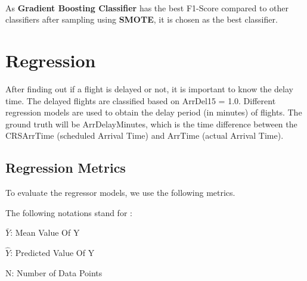 \documentclass[12pt,letter-paper]{article}
\begin{document}
    \paragraph{}
    As {\bfseries Gradient Boosting Classifier} has the best F1-Score compared to other classifiers after sampling using {\bfseries SMOTE}, it is chosen as the best classifier.
    
\section{Regression}

    After finding out if a flight is delayed or not, it is important to know the delay time. The delayed flights are classified based on ArrDel15 = 1.0. Different regression models are used to obtain the delay period (in minutes) of flights. The ground truth will be ArrDelayMinutes, which is the time difference between the CRSArrTime (scheduled Arrival Time) and ArrTime (actual Arrival Time).
    
    \subsection{Regression Metrics}
 
        To evaluate the regressor models, we use the following metrics.
        
        \begin{flushleft}
        
            The following notations stand for : 
            
            $\bar{Y}$: Mean Value Of Y
        
            $\hat{Y}$: Predicted Value Of Y
        
            N: Number of Data Points
        
        \end{flushleft}
        
\end{document}
